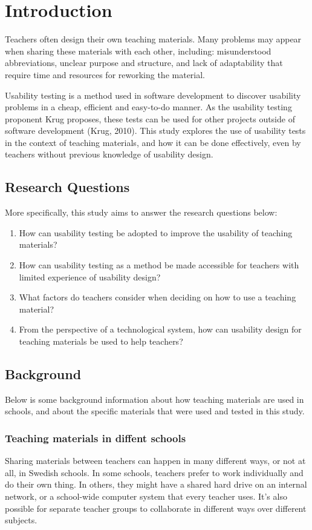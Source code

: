 \chapter{Introduction}

Teachers often design their own teaching materials. Many problems may appear when sharing these materials with each other, including: misunderstood abbreviations, unclear purpose and structure, and lack of adaptability that require time and resources for reworking the material.

Usability testing is a method used in software development to discover usability problems in a cheap, efficient and easy-to-do manner. As the usability testing proponent Krug proposes, these tests can be used for other projects outside of software development (Krug, 2010). This study explores the use of usability tests in the context of teaching materials, and how it can be done effectively, even by teachers without previous knowledge of usability design.

\section{Research Questions}
More specifically, this study aims to answer the research questions below:

\begin{enumerate}
	\item How can usability testing be adopted to improve the usability of teaching materials?
	\item How can usability testing as a method be made accessible for teachers with limited experience of usability design?
	\item What factors do teachers consider when deciding on how to use a teaching material?
	\item From the perspective of a technological system, how can usability design for teaching materials be used to help teachers?
\end{enumerate}

\section{Background}
Below is some background information about how teaching materials are used in schools, and about the specific materials that were used and tested in this study.

\subsection{Teaching materials in diffent schools}
Sharing materials between teachers can happen in many different ways, or not at all, in Swedish schools. In some schools, teachers prefer to work individually and do their own thing. In others, they might have a shared hard drive on an internal network, or a school-wide computer system that every teacher uses. It's also possible for separate teacher groups to collaborate in different ways over different subjects.

